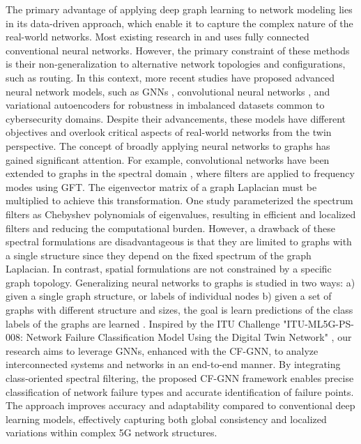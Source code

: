 The primary advantage of applying deep graph learning to network modeling \cite{habibi2019comprehensive} lies in its data-driven approach, which enable it to capture the complex nature of the real-world networks. Most existing research in \cite{ding2022data} and \cite{said2020network} uses fully connected conventional neural networks. However, the primary constraint of these methods is their non-generalization to alternative network topologies and configurations, such as routing. In this context, more recent studies have proposed advanced neural network models, such as GNNs \cite{al2024comparative, soltanzadeh2021rcsmote}, convolutional neural networks \cite{said2020network}, and variational autoencoders \cite{ding2018opportunities} for robustness in imbalanced datasets common to cybersecurity domains. Despite their advancements, these models have different objectives and overlook critical aspects of real-world networks from the twin perspective. The concept of broadly applying neural networks to graphs has gained significant attention. For example, convolutional networks have been extended to graphs in the spectral domain \cite{bruna2013spectral}, where filters are applied to frequency modes using GFT. The eigenvector matrix of a graph Laplacian must be multiplied to achieve this transformation. One study \cite{defferrard2016convolutional} parameterized the spectrum filters as Chebyshev polynomials of eigenvalues, resulting in efficient and localized filters and reducing the computational burden. However, a drawback of these spectral formulations are disadvantageous is that they are limited to graphs with a single structure since they depend on the fixed spectrum of the graph Laplacian. In contrast, spatial formulations are not constrained by a specific graph topology. Generalizing neural networks to graphs is studied in two ways: a) given a single graph structure, or labels of individual nodes \cite{scarselli2008graph, bruna2013spectral, lei2017deriving, li2015gated, defferrard2016convolutional, kipf2016semi} b) given a set of graphs with different structure and sizes, the goal is learn predictions of the class labels of the graphs are learned \cite{duvenaud2015convolutional, atwood2016diffusion, niepert2016learning}.  Inspired by the ITU Challenge "ITU-ML5G-PS-008: Network Failure Classification Model Using the Digital Twin Network" \cite{Junichi:2023}, our research aims to leverage GNNs, enhanced with the CF-GNN, to analyze interconnected systems and networks in an end-to-end manner. By integrating class-oriented spectral filtering, the proposed CF-GNN framework enables precise classification of network failure types and accurate identification of failure points. The approach improves accuracy and adaptability compared to conventional deep learning models, effectively capturing both global consistency and localized variations within complex 5G network structures.

